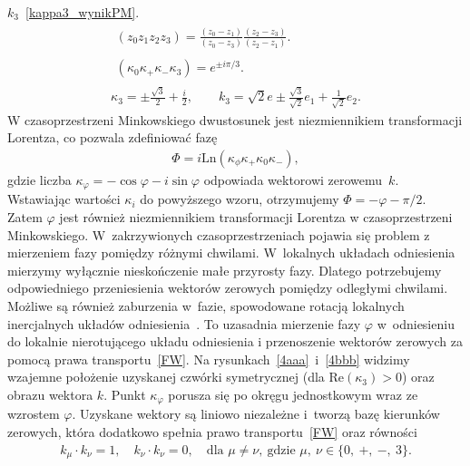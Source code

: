 $k_3$~\eqref{kappa3_wynikPM}. 
\begin{gather}\label{dwustosunek_definicja}
\begin{align}
(z_0z_1z_2z_3) = 
\frac{(z_0-z_1)}{(z_0-z_3)} 
\frac{(z_2-z_3)}{(z_2 -z_1)} .
\end{align}\\
\label{dwustosunek_kappa}
\begin{align}
(\kappa_0\kappa_+\kappa_-\kappa_3)
 = e^{\pm i\pi/3}. 
\end{align} \\  \label{kappa3_wynikPM}
\kappa_3 =\pm  \frac{\sqrt{3}}{2} + \frac{i}{2}, \qquad
k_3 = \sqrt{2} e\pm 
\frac{\sqrt{3}}{\sqrt{2}}e_1+ \frac{1}{\sqrt{2}} e_2.
\end{gather}
W czasoprzestrzeni Minkowskiego dwustosunek 
jest niezmiennikiem transformacji Lorentza, co 
pozwala zdefiniować fazę~\cite{Bratek2015wiele}
\begin{align*}
\Phi = i \text{Ln} \left( \kappa_\phi 
\kappa_+ \kappa_0 \kappa_- \right),
\end{align*}
gdzie liczba $\kappa_\varphi = -\cos\varphi - i \sin \varphi$
odpowiada wektorowi zerowemu~$k$. Wstawiając wartości $\kappa_i$ do
powyższego wzoru,
otrzymujemy $\Phi = -\varphi - \pi/2$. Zatem $\varphi$ jest również 
niezmiennikiem transformacji Lorentza w 
czasoprzestrzeni Minkowskiego. W~zakrzywionych 
czasoprzestrzeniach pojawia się problem z mierzeniem fazy pomiędzy 
różnymi chwilami. W~lokalnych układach odniesienia mierzymy wyłącznie 
nieskończenie małe przyrosty fazy. Dlatego potrzebujemy odpowiedniego
przeniesienia wektorów zerowych pomiędzy odległymi chwilami. 
Możliwe są również zaburzenia w~fazie, spowodowane rotacją 
lokalnych inercjalnych układów odniesienia~\cite{Bratek2015wiele}.
To uzasadnia mierzenie fazy $\varphi$ w~odniesieniu do 
lokalnie nierotującego układu odniesienia i przenoszenie wektorów 
zerowych za pomocą prawa transportu~\eqref{FW}.
Na rysunkach~\ref{4aaa}~i~\ref{4bbb}
widzimy wzajemne położenie 
uzyskanej czwórki symetrycznej (dla Re$ (\kappa_3) >0$) 
oraz obrazu wektora $k$. 
Punkt $\kappa_\varphi$ porusza się po okręgu jednostkowym 
wraz ze wzrostem $\varphi$. Uzyskane wektory są liniowo niezależne i~tworzą bazę 
kierunków zerowych, która dodatkowo spełnia 
prawo transportu~\eqref{FW} oraz równości
\begin{align*}
k_\mu \cdot k_\nu = 1 , 
\quad k_\nu \cdot k_\nu = 0,\quad \text{dla } \mu \neq \nu ,\ \text{gdzie }
\mu,\ \nu \in \{0,\ +,\ -,\ 3\}.
\end{align*} 
